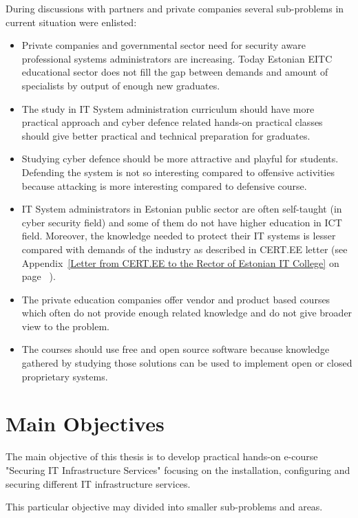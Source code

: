During discussions with partners and private companies several sub-problems in current situation were enlisted:
\begin{itemize}
\item Private companies and governmental sector need for security aware professional systems administrators are increasing. Today Estonian \gls{EITC} educational sector does not fill the gap between demands and amount of specialists by output of enough new graduates.
\item The study in IT System administration curriculum should have more practical approach and cyber defence related hands-on practical classes should give better practical and technical preparation for graduates.
\item Studying cyber defence should be more attractive and playful for students. Defending the system is not so interesting compared to offensive activities because attacking is more interesting compared to defensive course.
\item IT System administrators in Estonian public sector are often self-taught (in cyber security field) and some of them do not have higher education in \gls{ICT} field. Moreover, the knowledge needed to protect their IT systems is lesser compared with demands of the industry as described in CERT.EE letter (see Appendix~\ref{Letter from CERT.EE to the Rector of Estonian IT College} on page ~\pageref{Letter from CERT.EE to the Rector of Estonian IT College}).
\item The private education companies offer vendor and product based courses which often do not provide enough related knowledge and do not give broader view to the problem.
\item The courses should use free and open source software because knowledge gathered by studying those solutions can be used to implement open or closed proprietary systems.
\end{itemize}

\section{Main Objectives}

The main objective of this thesis is to develop practical hands-on e-course "Securing IT Infrastructure Services" focusing on the installation, configuring and securing different IT infrastructure services.

This particular objective may divided into smaller sub-problems and areas.

